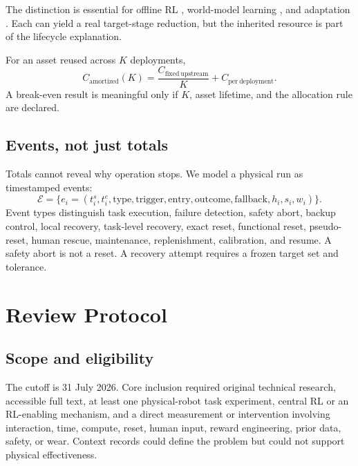 \documentclass[11pt]{article}
\begin{document}
The distinction is essential for offline RL \cite{nair2020awac,singh2021cog,kumar2023ptr,chebotar2023qtransformer,zhou2023realorl,walke2023ariel}, world-model learning \cite{wu2023daydreamer,lancaster2024modemv2,sharma2026worldgymnast,yin2026playworld}, and adaptation \cite{cully2015adaptanimals,nagabandi2019metarl,hu2025robottrainsrobot}. Each can yield a real target-stage reduction, but the inherited resource is part of the lifecycle explanation.

For an asset reused across $K$ deployments,
\begin{equation}
C_{\mathrm{amortized}}(K)=\frac{C_{\mathrm{fixed\ upstream}}}{K}
{}+C_{\mathrm{per\ deployment}}.
\end{equation}
A break-even result is meaningful only if $K$, asset lifetime, and the allocation rule are declared.

\subsection{Events, not just totals}

Totals cannot reveal why operation stops. We model a physical run as timestamped events:
\begin{equation}
\mathcal{E}=\{e_i=(t_i^{s},t_i^{e},\mathrm{type},\mathrm{trigger},
\mathrm{entry},\mathrm{outcome},\mathrm{fallback},h_i,s_i,w_i)\}.
\end{equation}
Event types distinguish task execution, failure detection, safety abort, backup control, local recovery, task-level recovery, exact reset, functional reset, pseudo-reset, human rescue, maintenance, replenishment, calibration, and resume. A safety abort is not a reset. A recovery attempt requires a frozen target set and tolerance.

\section{Review Protocol}

\subsection{Scope and eligibility}

The cutoff is 31 July 2026. Core inclusion required original technical research, accessible full text, at least one physical-robot task experiment, central RL or an RL-enabling mechanism, and a direct measurement or intervention involving interaction, time, compute, reset, human input, reward engineering, prior data, safety, or wear. Context records could define the problem but could not support physical effectiveness.
\end{document}

